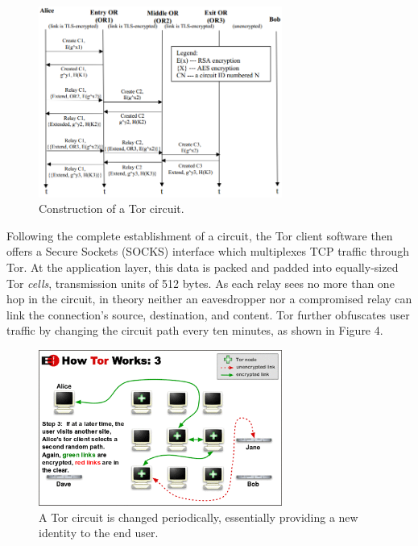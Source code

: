 \documentclass[journal]{IEEEtran}
\begin{document}
\begin{figure}[htbp]
\centering
\begin{minipage}{8 cm}
    \includegraphics[width=80mm]{resources/circuit-construction.png}
    \caption{Construction of a Tor circuit.}
\end{minipage}
\end{figure}

Following the complete establishment of a circuit, the Tor client software then offers a Secure Sockets (SOCKS) interface which multiplexes TCP traffic through Tor. At the application layer, this data is packed and padded into equally-sized Tor \textit{cells}, transmission units of 512 bytes. As each relay sees no more than one hop in the circuit, in theory neither an eavesdropper nor a compromised relay can link the connection's source, destination, and content. Tor further obfuscates user traffic by changing the circuit path every ten minutes,\cite{McCoy2008} as shown in Figure 4.

\begin{figure}[htbp]
\centering
\begin{minipage}{8 cm}
  \includegraphics[width=80mm]{resources/circuit-change.png}
  \caption{A Tor circuit is changed periodically, essentially providing a new identity to the end user.\cite{TorOverview}}
\end{minipage}
\end{figure}
\end{document}
